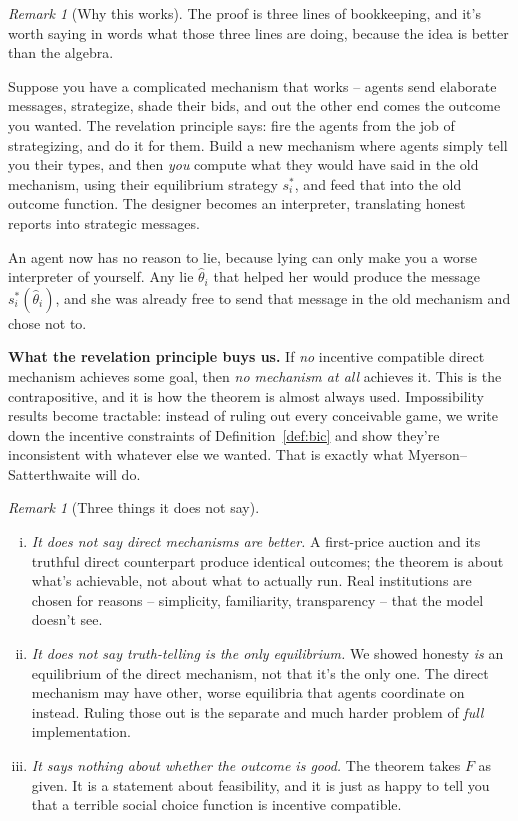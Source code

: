 \documentclass[12pt]{article}
\theoremstyle{definition}
\theoremstyle{remark}
\newtheorem{remark}[theorem]{Remark}
\theoremstyle{plain}                          %
\begin{document}
\begin{remark}[Why this works]
The proof is three lines of bookkeeping, and it's worth saying in words what those three lines are doing, because the idea is better than the algebra.
 
Suppose you have a complicated mechanism that works -- agents send elaborate messages, strategize, shade their bids, and out the other end comes the outcome you wanted. The revelation principle says: fire the agents from the job of strategizing, and do it for them. Build a new mechanism where agents simply tell you their types, and then \emph{you} compute what they would have said in the old mechanism, using their equilibrium strategy $s_i^*$, and feed that into the old outcome function. The designer becomes an interpreter, translating honest reports into strategic messages.
 
An agent now has no reason to lie, because lying can only make you a worse interpreter of yourself. Any lie $\hat\theta_i$ that helped her would produce the message $s_i^*(\hat\theta_i)$, and she was already free to send that message in the old mechanism and chose not to.
\end{remark}
 
\begin{keybox}
\textbf{What the revelation principle buys us.} If \emph{no} incentive compatible direct mechanism achieves some goal, then \emph{no mechanism at all} achieves it. This is the contrapositive, and it is how the theorem is almost always used. Impossibility results become tractable: instead of ruling out every conceivable game, we write down the incentive constraints of Definition~\ref{def:bic} and show they're inconsistent with whatever else we wanted. That is exactly what Myerson--Satterthwaite will do.
\end{keybox}
 
\begin{remark}[Three things it does not say]
\begin{enumerate}[(i), nosep, topsep=3pt]
    \item \emph{It does not say direct mechanisms are better.} A first-price auction and its truthful direct counterpart produce identical outcomes; the theorem is about what's achievable, not about what to actually run. Real institutions are chosen for reasons -- simplicity, familiarity, transparency -- that the model doesn't see.
    \item \emph{It does not say truth-telling is the only equilibrium.} We showed honesty \emph{is} an equilibrium of the direct mechanism, not that it's the only one. The direct mechanism may have other, worse equilibria that agents coordinate on instead. Ruling those out is the separate and much harder problem of \emph{full} implementation.
    \item \emph{It says nothing about whether the outcome is good.} The theorem takes $F$ as given. It is a statement about feasibility, and it is just as happy to tell you that a terrible social choice function is incentive compatible.
\end{enumerate}
\end{remark}
 
\end{document}
